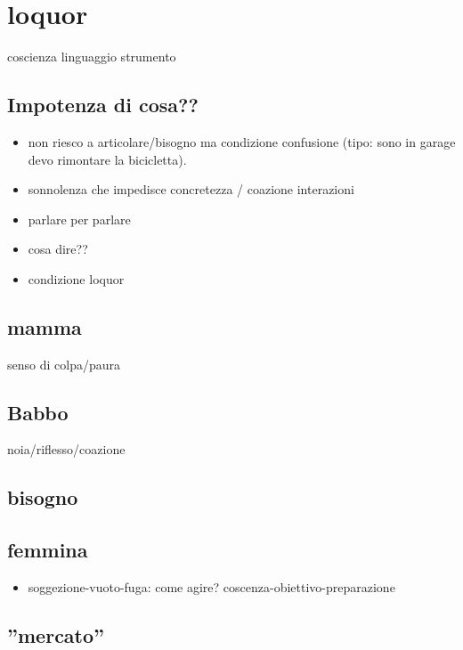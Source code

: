 \section{loquor}

coscienza linguaggio strumento

\subsection{Impotenza di cosa??}

\begin{itemize}
\item non riesco a articolare/bisogno  ma condizione confusione (tipo: sono in garage devo rimontare la bicicletta). 
\item sonnolenza che impedisce concretezza / coazione interazioni
\item parlare per parlare
\item cosa dire??
\item condizione loquor
\end{itemize}

\subsection{mamma}

senso di colpa/paura

\subsection{Babbo}

noia/riflesso/coazione

\subsection{bisogno}

\subsection{femmina}

\begin{itemize}
\item soggezione-vuoto-fuga: come agire?
coscenza-obiettivo-preparazione
\end{itemize}

\subsection{''mercato''}

